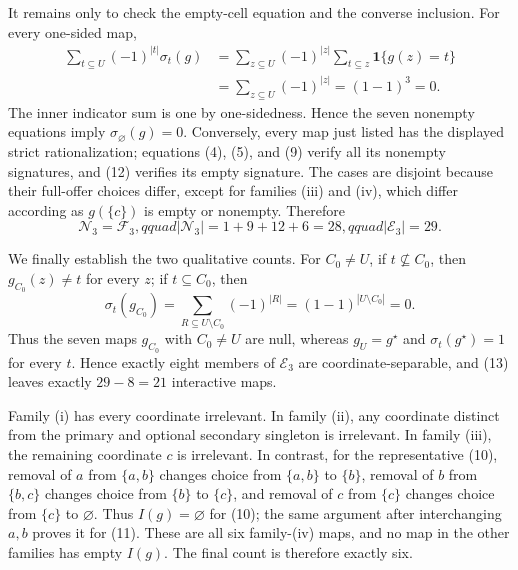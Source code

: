 It remains only to check the empty-cell equation and the converse inclusion.  For every one-sided map,
\[
\begin{aligned}
\sum_{t\subseteq U}(-1)^{|t|}\sigma_t(g)
&=\sum_{z\subseteq U}(-1)^{|z|}
  \sum_{t\subseteq z}\mathbf 1\{g(z)=t\}\\
&=\sum_{z\subseteq U}(-1)^{|z|}=(1-1)^3=0. 
\end{aligned} \tag{12}
\]
The inner indicator sum is one by one-sidedness.  Hence the seven nonempty equations imply \(\sigma_\varnothing(g)=0\).  Conversely, every map just listed has the displayed strict rationalization; equations (4), (5), and (9) verify all its nonempty signatures, and (12) verifies its empty signature.  The cases are disjoint because their full-offer choices differ, except for families (iii) and (iv), which differ according as \(g(\{c\})\) is empty or nonempty.  Therefore
\[
\mathcal N_3=\mathcal F_3,qquad
|\mathcal N_3|=1+9+12+6=28,qquad
|\mathcal E_3|=29. \tag{13}
\]

We finally establish the two qualitative counts.  For \(C_0\ne U\), if \(t\not\subseteq C_0\), then \(g_{C_0}(z)\ne t\) for every \(z\); if \(t\subseteq C_0\), then
\[
\sigma_t(g_{C_0})
=\sum_{R\subseteq U\setminus C_0}(-1)^{|R|}
=(1-1)^{|U\setminus C_0|}=0. \tag{14}
\]
Thus the seven maps \(g_{C_0}\) with \(C_0\ne U\) are null, whereas \(g_U=g^\star\) and \(\sigma_t(g^\star)=1\) for every \(t\).  Hence exactly eight members of \(\mathcal E_3\) are coordinate-separable, and (13) leaves exactly \(29-8=21\) interactive maps.

Family (i) has every coordinate irrelevant.  In family (ii), any coordinate distinct from the primary and optional secondary singleton is irrelevant.  In family (iii), the remaining coordinate \(c\) is irrelevant.  In contrast, for the representative (10), removal of \(a\) from \(\{a,b\}\) changes choice from \(\{a,b\}\) to \(\{b\}\), removal of \(b\) from \(\{b,c\}\) changes choice from \(\{b\}\) to \(\{c\}\), and removal of \(c\) from \(\{c\}\) changes choice from \(\{c\}\) to \(\varnothing\).  Thus \(I(g)=\varnothing\) for (10); the same argument after interchanging \(a,b\) proves it for (11).  These are all six family-(iv) maps, and no map in the other families has empty \(I(g)\).  The final count is therefore exactly six.


